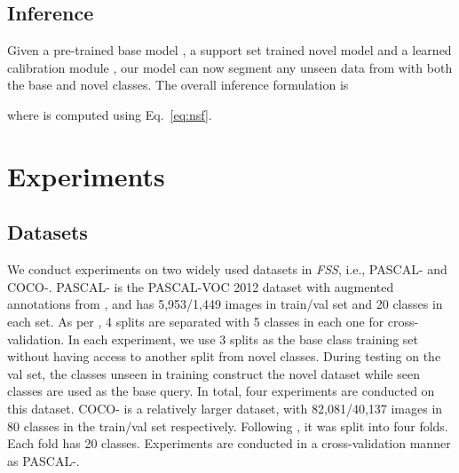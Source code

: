 \documentclass[journal]{IEEEtran}
\begin{document}
\subsection{Inference}
Given a pre-trained base model , a support set trained novel model  and a learned calibration module , our model can now segment any unseen data from  with both the base and novel classes. The overall inference formulation is 

where  is computed using Eq.~\ref{eq:nsf}.

\section{Experiments}
\subsection{Datasets} We conduct experiments on two widely used datasets in \textit{FSS}, i.e., PASCAL- and COCO-. 
PASCAL- is the PASCAL-VOC 2012 dataset \cite{everingham2010pascal} with augmented annotations from \cite{hariharan2014simultaneous}, and has 5,953/1,449 images in train/val set and 20 classes in each set. 
As per \cite{shaban2017one}, 4 splits  are separated with 5 classes in each one for cross-validation.
In each experiment, we use 3 splits as the base class training set without having access to another split from novel classes. 
During testing on the val set, the classes unseen in training construct the novel dataset while seen classes are used as the base query.
In total, four experiments are conducted on this dataset. 
COCO- is a relatively larger dataset, with 82,081/40,137 images in 80 classes in the train/val set respectively. 
Following \cite{nguyen2019feature}, it was split into four folds. 
Each fold has 20 classes. 
Experiments are conducted in a cross-validation manner as PASCAL-.
\end{document}
